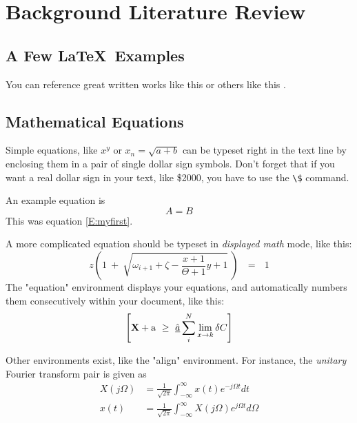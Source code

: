 \chapter{Background Literature Review}


\section{A Few \LaTeX\ Examples}

You can reference great written works like this \cite{ABC} or
others like this \cite{XYZ}.


\section {Mathematical Equations}
Simple equations, like $x^y$ or $x_n = \sqrt{a + b}$ can be typeset right
in the text line by enclosing them in a pair of single dollar sign symbols.
Don't forget that if you want a real dollar sign in your text, like \$2000,
you have to use the \verb+\$+ command.

An example equation is
\begin{equation} \label{E:myfirst}
	A = B
\end{equation}
This was equation \eqref{E:myfirst}.

A more complicated equation should be typeset in {\em displayed math\/} mode,
like this:
\[
	z \left( 1 \ +\ \sqrt{\omega_{i+1} + \zeta -\frac{x+1}{\Theta +1} y + 1} 
	\ \right)
	\ \ \ =\ \ \ 1
\]
The "equation" environment displays your equations, and automatically
numbers them consecutively within your document, like this:
\begin{equation}
	\left[
		{\bf X} + {\rm a} \ \geq\ 
		\underline{\hat a} \sum_i^N \lim_{x \rightarrow k} \delta C
	\right]
\end{equation}


Other environments exist, like the "align" environment.  For instance,
the {\em unitary} Fourier transform pair is given as
\begin{align}
	X(j\Omega) &= \frac{1}{\sqrt{2\pi}} \int_{-\infty}^{\infty} x(t) e^{-j\Omega t} dt\\
	x(t) &= \frac{1}{\sqrt{2\pi}} \int_{-\infty}^{\infty} X(j\Omega) e^{j\Omega t} d\Omega
\end{align}

